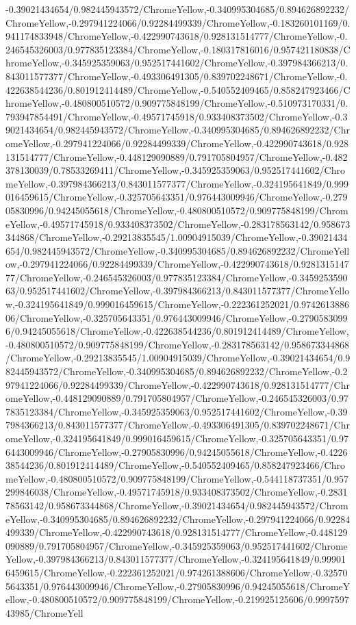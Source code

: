 {\begin{tikzternal}
{-0.39021434654/0.982445943572/ChromeYellow,-0.340995304685/0.894626892232/ChromeYellow,-0.297941224066/0.92284499339/ChromeYellow,-0.183260101169/0.941174833948/ChromeYellow,-0.422990743618/0.928131514777/ChromeYellow,-0.246545326003/0.977835123384/ChromeYellow,-0.180317816016/0.957421180838/ChromeYellow,-0.345925359063/0.952517441602/ChromeYellow,-0.397984366213/0.843011577377/ChromeYellow,-0.493306491305/0.839702248671/ChromeYellow,-0.422638544236/0.801912414489/ChromeYellow,-0.540552409465/0.858247923466/ChromeYellow,-0.480800510572/0.909775848199/ChromeYellow,-0.510973170331/0.793947854491/ChromeYellow,-0.49571745918/0.933408373502/ChromeYellow,-0.39021434654/0.982445943572/ChromeYellow,-0.340995304685/0.894626892232/ChromeYellow,-0.297941224066/0.92284499339/ChromeYellow,-0.422990743618/0.928131514777/ChromeYellow,-0.448129090889/0.791705804957/ChromeYellow,-0.482378130039/0.78533269411/ChromeYellow,-0.345925359063/0.952517441602/ChromeYellow,-0.397984366213/0.843011577377/ChromeYellow,-0.324195641849/0.999016459615/ChromeYellow,-0.325705643351/0.976443009946/ChromeYellow,-0.27905830996/0.94245055618/ChromeYellow,-0.480800510572/0.909775848199/ChromeYellow,-0.49571745918/0.933408373502/ChromeYellow,-0.283178563142/0.958673344868/ChromeYellow,-0.29213835545/1.00904915039/ChromeYellow,-0.39021434654/0.982445943572/ChromeYellow,-0.340995304685/0.894626892232/ChromeYellow,-0.297941224066/0.92284499339/ChromeYellow,-0.422990743618/0.928131514777/ChromeYellow,-0.246545326003/0.977835123384/ChromeYellow,-0.345925359063/0.952517441602/ChromeYellow,-0.397984366213/0.843011577377/ChromeYellow,-0.324195641849/0.999016459615/ChromeYellow,-0.222361252021/0.974261388606/ChromeYellow,-0.325705643351/0.976443009946/ChromeYellow,-0.27905830996/0.94245055618/ChromeYellow,-0.422638544236/0.801912414489/ChromeYellow,-0.480800510572/0.909775848199/ChromeYellow,-0.283178563142/0.958673344868/ChromeYellow,-0.29213835545/1.00904915039/ChromeYellow,-0.39021434654/0.982445943572/ChromeYellow,-0.340995304685/0.894626892232/ChromeYellow,-0.297941224066/0.92284499339/ChromeYellow,-0.422990743618/0.928131514777/ChromeYellow,-0.448129090889/0.791705804957/ChromeYellow,-0.246545326003/0.977835123384/ChromeYellow,-0.345925359063/0.952517441602/ChromeYellow,-0.397984366213/0.843011577377/ChromeYellow,-0.493306491305/0.839702248671/ChromeYellow,-0.324195641849/0.999016459615/ChromeYellow,-0.325705643351/0.976443009946/ChromeYellow,-0.27905830996/0.94245055618/ChromeYellow,-0.422638544236/0.801912414489/ChromeYellow,-0.540552409465/0.858247923466/ChromeYellow,-0.480800510572/0.909775848199/ChromeYellow,-0.544118737351/0.957299846038/ChromeYellow,-0.49571745918/0.933408373502/ChromeYellow,-0.283178563142/0.958673344868/ChromeYellow,-0.39021434654/0.982445943572/ChromeYellow,-0.340995304685/0.894626892232/ChromeYellow,-0.297941224066/0.92284499339/ChromeYellow,-0.422990743618/0.928131514777/ChromeYellow,-0.448129090889/0.791705804957/ChromeYellow,-0.345925359063/0.952517441602/ChromeYellow,-0.397984366213/0.843011577377/ChromeYellow,-0.324195641849/0.999016459615/ChromeYellow,-0.222361252021/0.974261388606/ChromeYellow,-0.325705643351/0.976443009946/ChromeYellow,-0.27905830996/0.94245055618/ChromeYellow,-0.480800510572/0.909775848199/ChromeYellow,-0.219925125606/0.999759743985/ChromeYell}
\end{tikzternal}}

